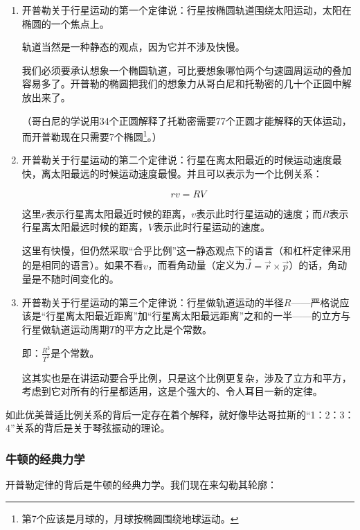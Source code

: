 \begin{enumerate}
\item 

开普勒关于行星运动的第一个定律说：行星按椭圆轨道围绕太阳运动，太阳在椭圆的一个焦点上。

轨道当然是一种静态的观点，因为它并不涉及快慢。

我们必须要承认想象一个椭圆轨道，可比要想象哪怕两个匀速圆周运动的叠加容易多了。开普勒的椭圆把我们的想象力从哥白尼和托勒密的几十个正圆中解放出来了。

（哥白尼的学说用34个正圆解释了托勒密需要77个正圆才能解释的天体运动，而开普勒现在只需要7个椭圆\footnote{第7个应该是月球的，月球按椭圆围绕地球运动。}。）

\item

开普勒关于行星运动的第二个定律说：行星在离太阳最近的时候运动速度最快，离太阳最远的时候运动速度最慢。并且可以表示为一个比例关系：

\begin{equation}
r v = R V
\end{equation}

这里$r$表示行星离太阳最近时候的距离，$v$表示此时行星运动的速度；而$R$表示行星离太阳最远时候的距离，$V$表示此时行星运动的速度。

这里有快慢，但仍然采取“合乎比例”这一静态观点下的语言（和杠杆定律采用的是相同的语言）。如果不看$v$，而看角动量（定义为$\vec J = \vec r \times \vec p$）的话，角动量是不随时间变化的。

\item

开普勒关于行星运动的第三个定律说：行星做轨道运动的半径$R$——严格说应该是“行星离太阳最近距离”加“行星离太阳最远距离”之和的一半——的立方与行星做轨道运动周期$T$的平方之比是个常数。

即：$\frac{R^3}{T^2} $是个常数。

这其实也是在讲运动要合乎比例，只是这个比例更复杂，涉及了立方和平方，考虑到它对所有的行星都适用，这是个强大的、令人耳目一新的定律。

\end{enumerate}

如此优美普适比例关系的背后一定存在着个解释，就好像毕达哥拉斯的“1：2：3：4”关系的背后是关于琴弦振动的理论。

\subsubsection{牛顿的经典力学}

开普勒定律的背后是牛顿的经典力学。我们现在来勾勒其轮廓：

